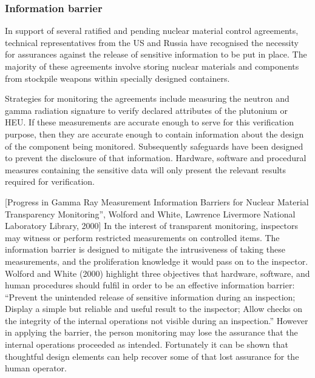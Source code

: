\documentclass[twocolumn,a4paper]{article}
\begin{document}
\subsubsection{Information barrier}
In support of several ratified and pending nuclear material control
agreements, technical representatives from the US and Russia have
recognised the necessity for assurances against the release of
sensitive information to be put in place.  The majority of these
agreements involve storing nuclear materials and components from
stockpile weapons within specially designed containers.

Strategies for monitoring the agreements include measuring the neutron
and gamma radiation signature to verify declared attributes of the
plutonium or HEU.  If these measurements are accurate enough to serve
for this verification purpose, then they are accurate enough to
contain information about the design of the component being
monitored. Subsequently safeguards have been designed to prevent the
disclosure of that information. Hardware, software and procedural
measures containing the sensitive data will only present the relevant
results required for verification.

[Progress in Gamma Ray Measurement Information Barriers for Nuclear
  Material Transparency Monitoring'', Wolford and White, Lawrence
  Livermore National Laboratory Library, 2000] In the interest of
transparent monitoring, inspectors may witness or perform restricted
measurements on controlled items. The information barrier is designed
to mitigate the intrusiveness of taking these measurements, and the
proliferation knowledge it would pass on to the inspector. Wolford and
White (2000) highlight three objectives that hardware, software, and
human procedures should fulfil in order to be an effective
information barrier: ``Prevent the unintended release of sensitive
information during an inspection; Display a simple but reliable and
useful result to the inspector; Allow checks on the integrity of the
internal operations not visible during an inspection.''  However in
applying the barrier, the person monitoring may lose the assurance
that the internal operations proceeded as intended. Fortunately it can
be shown that thoughtful design elements can help recover some of that
lost assurance for the human operator.
\end{document}
